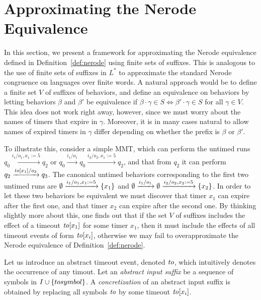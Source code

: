 \section{Approximating the Nerode Equivalence}
\label{sec:approx}

In this section, we present a framework for approximating the Nerode equivalence
defined in Definition~\ref{def:nerode} using finite sets of suffixes. This
is analogous to the use of finite sets of suffixes in $L^*$ to approximate the
standard Nerode congruence on languages over finite words. A natural approach
would be to define a finite set $V$ of suffixes of behaviors, and define
an equivalence on behaviors by letting 
behaviors $\beta$ and $\beta'$ be equivalence if $\beta \cdot \gamma \in S \Leftrightarrow \beta' \cdot \gamma \in S$ for all $\gamma \in V$.
This idea does not work right away, however, since we must worry about the
names of timers that expire in $\gamma$. Moreover, it is in many cases natural to
allow names of expired timers in $\gamma$ differ depending on whether the
prefix is $\beta$ or $\beta'$.

To illustrate this, consider a simple MMT, which can perform the untimed runs
\(
q_0 \xrightarrow{i_1/o_1, x_1:= 5} q_2
\)
or
\(
q_0 \xrightarrow{i_1/o_1} q_0 \xrightarrow{i_2/o_2, x_1:= 5} q_2
\),
and that from $q_2$ it can perform
\(
q_2 \xrightarrow{\mathit{to}[x_1]/o_3} q_3
\).
The canonical untimed behaviors corresponding to the first two
untimed runs are
\(
\emptyset \xrightarrow{i_1/o_1, x_1:= 5} \lbrace x_1\rbrace
\)
and
\(
\emptyset \xrightarrow{i_1/o_1} \emptyset \xrightarrow{i_2/o_2, x_2:= 5} \lbrace x_2\rbrace
\).
In order to let these two behaviors be equivalent we must discover that
timer $x_1$ can expire after the first one, and that
timer $x_2$ can expire after the second one. By thinking slightly more about
this, one finds out that if the set $V$ of suffixes includes
the effect of a timeout $\mathit{to}[x_1]$ for some timer $x_1$, then it must
include the effects of all timeout events of form $\mathit{to}[x_i]$, otherwise we
may fail to overapproximate the Nerode equivalence of Definition~\ref{def:nerode}.

Let us introduce an abstract timeout event, denoted $\mathit{to}$, which 
intuitively denotes the occurrence of any timout. Let an {\em abstract
input suffix} be a sequence of symbols in $I \cup \lbrace tosymbol\rbrace$.
A {\em concretization} of an abstract input suffix is obtained by replacing all
symbols $\mathit{to}$ by some timeout $\mathit{to}[x_i]$. 

